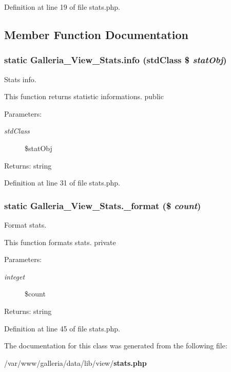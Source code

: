 Definition at line 19 of file stats.php.

\subsection{Member Function Documentation}
\subsubsection{\setlength{\rightskip}{0pt plus 5cm}static Galleria\_\-View\_\-Stats.info (stdClass \$ {\em statObj})\hspace{0.3cm}{\tt  [static]}}\label{classGalleria__View__Stats_91474152d87d0292eee002f27ad746c3}


Stats info.

This function returns statistic informations.  public

\begin{Desc}
\item[Parameters:]
\begin{description}
\item[{\em stdClass}]\$statObj \end{description}
\end{Desc}
\begin{Desc}
\item[Returns:]string \end{Desc}


Definition at line 31 of file stats.php.
\subsubsection{\setlength{\rightskip}{0pt plus 5cm}static Galleria\_\-View\_\-Stats.\_\-format (\$ {\em count})\hspace{0.3cm}{\tt  [static, protected]}}\label{classGalleria__View__Stats_04baf0345828f38a22433a0e175f342f}


Format stats.

This function formats stats.  private

\begin{Desc}
\item[Parameters:]
\begin{description}
\item[{\em integet}]\$count \end{description}
\end{Desc}
\begin{Desc}
\item[Returns:]string \end{Desc}


Definition at line 45 of file stats.php.

The documentation for this class was generated from the following file:\begin{CompactItemize}
\item 
/var/www/galleria/data/lib/view/{\bf stats.php}\end{CompactItemize}
